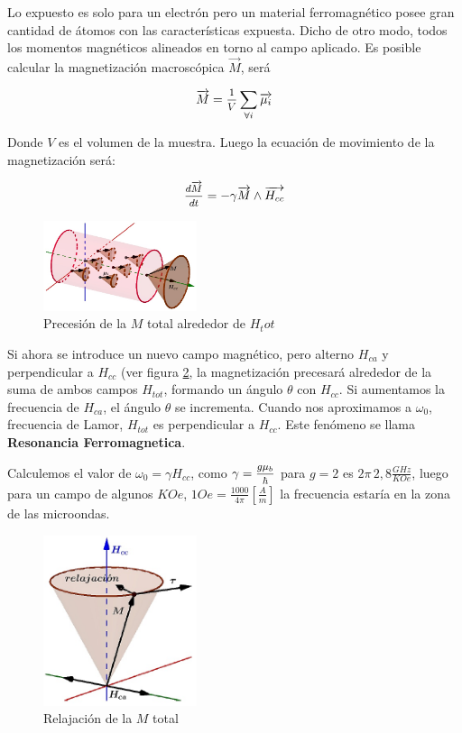 Lo expuesto es solo para un electrón pero un material ferromagnético posee gran cantidad de átomos con las características expuesta. Dicho de otro modo, todos los momentos magnéticos alineados en torno al campo aplicado. Es posible calcular la magnetización macroscópica $\overrightarrow{M}$, será

\begin{equation}
	\overrightarrow{M}=\mfrac{1}{V} \sum_{\forall i} \overrightarrow{\mu_{i}} 
\end{equation}

Donde $V$ es el volumen de la muestra. Luego la ecuación de movimiento de la magnetización será:

\begin{equation}
	\mfrac{d\overrightarrow{M}}{dt}=-\gamma \overrightarrow{M}\wedge \overrightarrow{H_{cc}} 
\end{equation}

\begin{figure}[H]
    \centering
    \includegraphics[width=0.4\textwidth]{./Figures/fig332}
	\caption{Precesión de la $M$ total alrededor de $H_tot$}
	\label{fig:332}
\end{figure}

Si ahora se introduce un nuevo campo magnético, pero alterno $H_{ca}$ y perpendicular a $H_{cc}$ (ver figura \ref{fig:333}, la magnetización precesará alrededor de la suma de ambos campos $H_{tot}$, formando un ángulo $\theta$ con $H_{cc}$. Si aumentamos la frecuencia de $H_{ca}$, el ángulo $\theta$ se incrementa. Cuando nos aproximamos a $\omega_{0}$, frecuencia de Lamor, $H_{tot}$ es perpendicular a $H_{cc}$.
Este fenómeno se llama \textbf{Resonancia Ferromagnetica}.

Calculemos el valor de $\omega_{0}=\gamma H_{cc}$, como $\gamma=\mfrac{g\mu_{b}}{\hbar}$ para $g=2$ es $2\pi\,2,8 \frac{GHz}{KOe}$, luego para un campo de algunos $KOe$, $1Oe= \frac{1000}{4\pi}\left[\frac{A}{m} \right]$ la frecuencia estaría en la zona de las microondas.

\begin{figure}[H]
    \centering
    \includegraphics[width=0.4\textwidth]{./Figures/fig333}
	\caption{Relajación de la $M$ total}
	\label{fig:333}
\end{figure}

